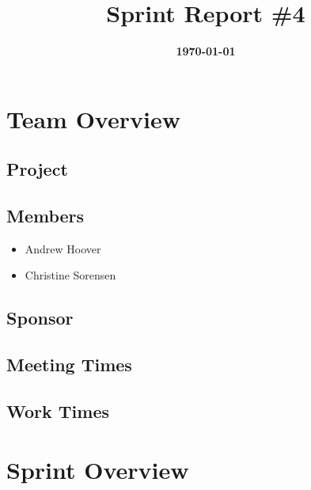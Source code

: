\documentclass{article}
\title{\normalfont\Large\bfseries\color{TitleColor}Sprint Report \#4}
\date{\normalfont\bfseries\color{TitleColor}\today}
\begin{document}
\maketitle

\section*{Team Overview}
\subsection*{Project}

\subsection*{Members}
\begin{itemize}
	\item Andrew Hoover
	\item Christine Sorensen
\end{itemize}

\subsection*{Sponsor}

\subsection*{Meeting Times}
\subsection*{Work Times}

\section*{Sprint Overview}
\end{document}
